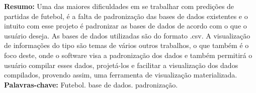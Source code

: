\begin{singlespace}
\textbf{Resumo: }
Uma das maiores dificuldades em se trabalhar com predições de partidas de futebol, é a falta de padronização das bases de dados existentes e o intuito com esse projeto é padronizar as bases de dados de acordo com o que o usuário deseja. As bases de dados utilizadas são do formato .csv. A visualização de informações do tipo são temas de vários outros trabalhos, o que também é o foco deste, onde o software visa a padronização dos dados e também permitirá o usuário compilar esses dados, projetá-los e facilitar a visualização dos dados compilados, provendo assim, uma ferramenta de visualização materializada.\\
\textbf{Palavras-chave: }
Futebol. base de dados. padronização.
\end{singlespace}

